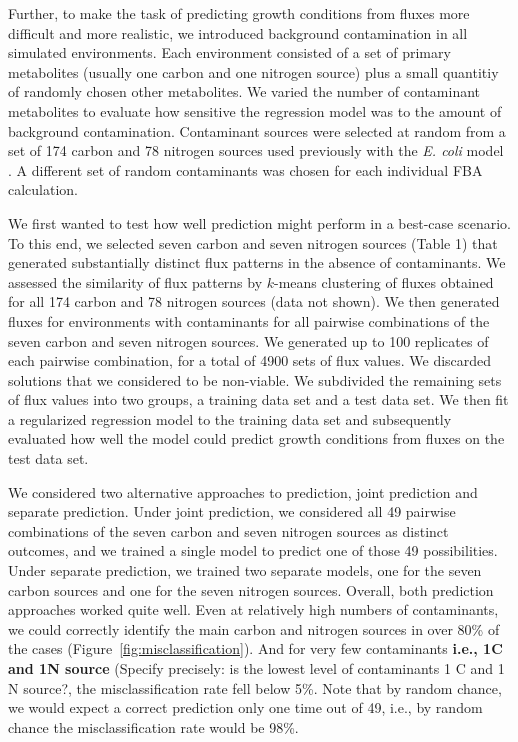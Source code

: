 \documentclass[12pt]{article}
\begin{document}
Further, to make the task of predicting growth conditions from fluxes more difficult and more realistic, we introduced background contamination in all simulated environments. Each environment consisted of a set of primary metabolites (usually one carbon and one nitrogen source) plus a small quantitiy of randomly chosen other metabolites. We varied the number of contaminant metabolites to evaluate how sensitive the regression model was to the amount of background contamination. Contaminant sources were selected at random from a set of 174 carbon and 78 nitrogen sources used previously with the \emph{E. coli} model \cite{Feistetal2007}. A different set of random contaminants was chosen for each individual FBA calculation.

We first wanted to test how well prediction might perform in a best-case scenario. To this end, we selected seven carbon and seven nitrogen sources ({\color{red}Table 1}) that generated substantially distinct flux patterns in the absence of contaminants. We assessed the similarity of flux patterns by $k$-means clustering of fluxes obtained for all 174 carbon and 78 nitrogen sources (data not shown). We then generated fluxes for environments with contaminants for all pairwise combinations of the seven carbon and seven nitrogen sources. We generated up to 100 replicates of each pairwise combination, for a total of 4900 sets of flux values. We discarded solutions that we considered to be non-viable. We subdivided the remaining sets of flux values into two groups, a training data set and a test data set. We then fit a regularized regression model to the training data set and subsequently evaluated how well the model could predict growth conditions from fluxes on the test data set.

We considered two alternative approaches to prediction, joint prediction and separate prediction. Under joint prediction, we considered all 49 pairwise combinations of the seven carbon and seven nitrogen sources as distinct outcomes, and we trained a single model to predict one of those 49 possibilities. Under separate prediction, we trained two separate models, one for the seven carbon sources and one for the seven nitrogen sources. Overall, both prediction approaches worked quite well.  Even at relatively high numbers of contaminants, we could correctly identify the main carbon and nitrogen sources in over 80\% of the cases (Figure~\ref{fig:misclassification}). And for very few contaminants \textbf{i.e., 1C and 1N source} {\color{red}(Specify precisely: is the lowest level of contaminants 1 C and 1 N source?}, the misclassification rate fell below 5\%. Note that by random chance, we would expect a correct prediction only one time out of 49, i.e., by random chance the misclassification rate would be 98\%.
\end{document}
